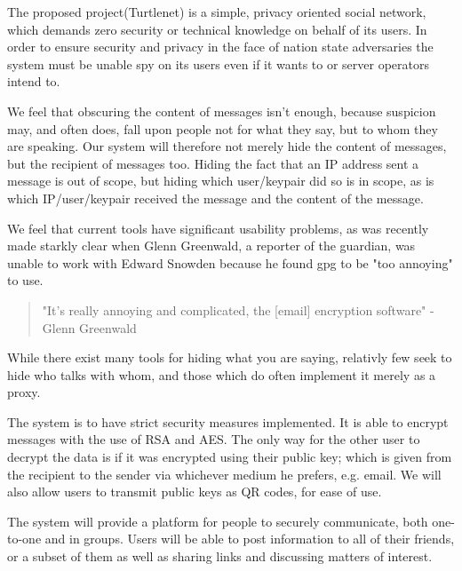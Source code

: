 The proposed project(Turtlenet) is a simple, privacy oriented social
network, which demands zero security or technical knowledge on behalf of its
users. In order to ensure security and privacy in the face of nation state
adversaries the system must be unable spy on its users even if it wants to or
server operators intend to.

We feel that obscuring the content of messages isn't enough, because suspicion
may, and often does, fall upon people not for what they say, but to whom they
are speaking. Our system will therefore not merely hide
the content of messages, but the recipient of messages too. Hiding the fact that
an IP address sent a message is out of scope, but hiding which user/keypair did
so is in scope, as is which IP/user/keypair received the message and the content
of the message.

We feel that current tools have significant usability problems, as was recently
made starkly clear when Glenn Greenwald, a reporter of the guardian, was unable
to work with Edward Snowden because he found gpg to be "too annoying" to use.

\begin{quote}
"It’s really annoying and complicated, the [email] encryption software" - Glenn
Greenwald \cite{greenwaldAnnoying}
\end{quote}

While there exist many tools for hiding what you are saying, relativly few seek
to hide who talks with whom, and those which do often implement it merely as a proxy.

The system is to have strict security measures implemented. It is able to
encrypt messages with the use of RSA and AES. The only way for the other user to
decrypt the data is if it was encrypted using their public key; which is given
from the recipient to the sender via whichever medium he prefers, e.g. email.
We will also allow users to transmit public keys as QR codes, for ease of use.

The system will provide a platform for people to securely communicate, both
one-to-one and in groups. Users will be able to post information to all of their
friends, or a subset of them as well as sharing links and discussing matters of
interest.

